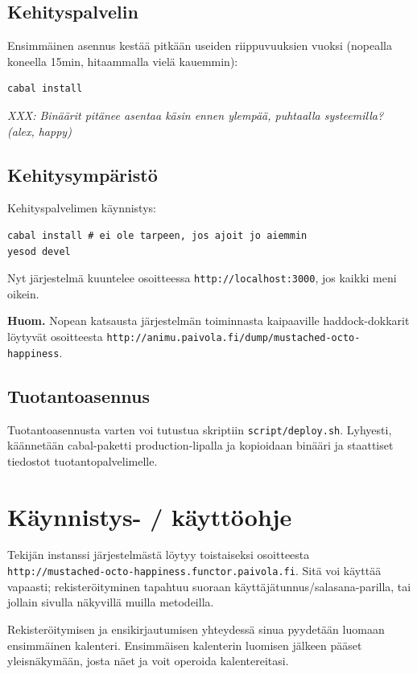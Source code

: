 \documentclass[a4paper,12pt]{report}
\begin{document}
\subsection{Kehityspalvelin}

Ensimmäinen asennus kestää pitkään useiden riippuvuuksien vuoksi (nopealla
koneella 15min, hitaammalla vielä kauemmin):
\begin{verbatim}
cabal install
\end{verbatim}

\textit{XXX: Binäärit pitänee asentaa käsin ennen ylempää, puhtaalla systeemilla?
(alex, happy)}

\subsection{Kehitysympäristö}

Kehityspalvelimen käynnistys:
\begin{verbatim}
cabal install # ei ole tarpeen, jos ajoit jo aiemmin
yesod devel
\end{verbatim}

Nyt järjestelmä kuuntelee osoitteessa \texttt{http://localhost:3000}, jos kaikki
meni oikein.

\textbf{Huom.} Nopean katsausta järjestelmän toiminnasta kaipaaville
haddock-dokkarit löytyvät osoitteesta
\texttt{http://animu.paivola.fi/dump/mustached-octo-happiness}.

\subsection{Tuotantoasennus}

Tuotantoasennusta varten voi tutustua skriptiin \texttt{script/deploy.sh}.
Lyhyesti, käännetään cabal-paketti production-lipalla ja kopioidaan binääri ja
staattiset tiedostot tuotantopalvelimelle.

\section{Käynnistys- / käyttöohje}

Tekijän instanssi järjestelmästä löytyy toistaiseksi osoitteesta
\\\texttt{http://mustached-octo-happiness.functor.paivola.fi}. Sitä voi käyttää
vapaasti; rekisteröityminen tapahtuu suoraan käyttäjätunnus/salasana-parilla,
tai jollain sivulla näkyvillä muilla metodeilla.

Rekisteröitymisen ja ensikirjautumisen yhteydessä sinua pyydetään luomaan
ensimmäinen kalenteri. Ensimmäisen kalenterin luomisen jälkeen pääset
yleisnäkymään, josta näet ja voit operoida kalentereitasi.
\end{document}
